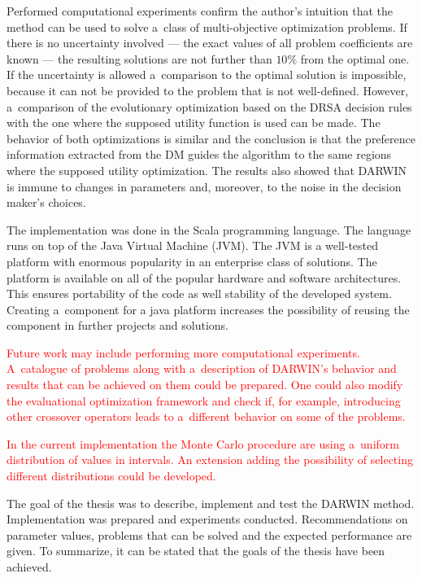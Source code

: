 Performed computational experiments confirm the author's intuition that the
method can be used to solve a~class of multi-objective optimization
problems. If there is no uncertainty involved --- the exact values of all
problem coefficients are known --- the resulting solutions are not further
than $10\%$ from the optimal one. If the uncertainty is allowed a~comparison
to the optimal solution is impossible, because it can not be provided to the
problem that is not well-defined. However, a~comparison of the evolutionary
optimization based on the DRSA decision rules with the one where the supposed
utility function is used can be made. The behavior of both optimizations is
similar and the conclusion is that the preference information extracted from
the DM guides the algorithm to the same regions where the supposed utility
optimization. The results also showed that DARWIN is immune to changes in
parameters and, moreover, to the noise in the decision maker's choices.

The implementation was done in the Scala programming language. The language
runs on top of the Java Virtual Machine (JVM). The JVM is a well-tested
platform with enormous popularity in an enterprise class of solutions. The
platform is available on all of the popular hardware and software
architectures. This ensures portability of the code as well stability of the
developed system. Creating a~component for a java platform increases the
possibility of reusing the component in further projects and solutions.

\textcolor{red}{Future work may include performing more computational
  experiments. A~catalogue of problems along with a~description of DARWIN's
  behavior and results that can be achieved on them could be prepared. One
  could also modify the evaluational optimization framework and check if, for
  example, introducing other crossover operators leads to a~different behavior
  on some of the problems.} 

\textcolor{red}{ In the current implementation the Monte Carlo procedure are
  using a~uniform distribution of values in intervals.  An extension adding
  the possibility of selecting different distributions could be developed. }

The goal of the thesis was to describe, implement and test the DARWIN
method. Implementation was prepared and experiments conducted. Recommendations
on parameter values, problems that can be solved and the expected performance
are given. To summarize, it can be stated that the goals of the thesis have
been achieved.



